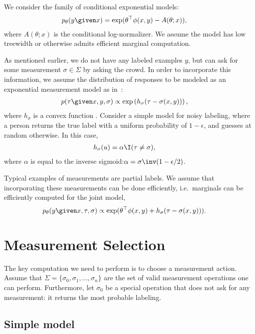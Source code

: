 We consider the family of conditional exponential models:
\begin{align*}
  p_\theta(y \given x) 
  &= \exp( \theta^\top \phi(x, y) - A(\theta; x)),
\end{align*}
where $A(\theta; x)$ is the conditional log-normalizer.
We assume the model has low treewidth or otherwise admits efficient marginal computation.

As mentioned earlier, we do not have any labeled examples $y$, but can ask for some measurement $\sigma \in \Sigma$ by asking the crowd. 
In order to incorporate this information, we assume the distribution of responses to be modeled as an exponential measurement model as in~\cite{liang09measurements}:
\begin{align*}
  p(\tau \given x, y, \sigma) 
  &\propto \exp \left( h_\sigma(\tau - \sigma(x,y)) \right),
\end{align*}
where $h_\sigma$ is a convex function .
Consider a simple model for noisy labeling, where a person returns the true label with a uniform probability of $1- \epsilon$, and guesses at random otherwise. In this case, 
\begin{align*}
  h_\sigma(u) &= \alpha \I(\tau \neq \sigma),
\end{align*}
where $\alpha$ is equal to the inverse sigmoid:$\alpha = \sigma\inv(1 - \epsilon/2)$.

Typical examples of measurements are partial labels.
We assume that incorporating these measurements can be done efficiently, i.e.\ marginals can be efficiently computed for the joint model,
\begin{align*}
  p_\theta(y \given x, \tau, \sigma) 
  &\propto \exp(\theta^\top \phi(x, y) + h_\sigma(\tau - \sigma(x,y))).
\end{align*}

\section{Measurement Selection}
\label{sec:measurement}

The key computation we need to perform is to choose a measurement action.
Assume that $\Sigma = \{\sigma_0, \sigma_1, \dots, \sigma_n\}$ are the set of valid measurement operations one can perform. 
Furthermore, let $\sigma_0$ be a special operation that does not ask for any measurement: it returns the most probable  labeling.

\subsection{Simple model}
\label{sec:simple}

